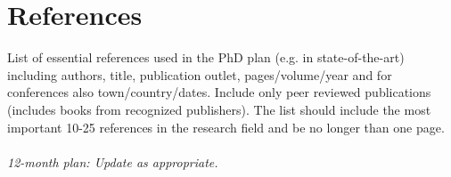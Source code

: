 \section{References}
List of essential references used in the PhD plan (e.g. in state-of-the-art) including authors, title, publication outlet, pages/volume/year and for conferences also town/country/dates. Include only peer reviewed publications (includes books from recognized publishers). The list should include the most important 10-25 references in the research field and be no longer than one page.
\\
\\
\textit{12-month plan: Update as appropriate.}

\begingroup
\scriptsize
\renewcommand{\section}[2]{}


\endgroup